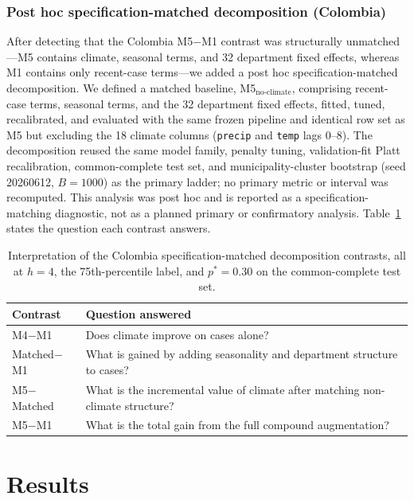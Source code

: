 \documentclass[11pt,a4paper]{article}
\begin{document}
\subsubsection*{Post hoc specification-matched decomposition (Colombia)}
After detecting that the Colombia M5$-$M1 contrast was structurally unmatched---M5 contains climate, seasonal terms, and 32 department fixed effects, whereas M1 contains only recent-case terms---we added a post hoc specification-matched decomposition. We defined a matched baseline, M5$_{\text{no-climate}}$, comprising recent-case terms, seasonal terms, and the 32 department fixed effects, fitted, tuned, recalibrated, and evaluated with the same frozen pipeline and identical row set as M5 but excluding the 18 climate columns (\texttt{precip} and \texttt{temp} lags 0--8). The decomposition reused the same model family, penalty tuning, validation-fit Platt recalibration, common-complete test set, and municipality-cluster bootstrap (seed 20260612, $B=1000$) as the primary ladder; no primary metric or interval was recomputed. This analysis was post hoc and is reported as a specification-matching diagnostic, not as a planned primary or confirmatory analysis. Table~\ref{tab:contrastq} states the question each contrast answers.

\begin{table}[H]
\centering
\caption{Interpretation of the Colombia specification-matched decomposition contrasts, all at $h=4$, the 75th-percentile label, and $p^*=0.30$ on the common-complete test set.}
\label{tab:contrastq}
\begin{tabular}{ll}
\toprule
Contrast & Question answered \\
\midrule
M4$-$M1 & Does climate improve on cases alone? \\
Matched$-$M1 & What is gained by adding seasonality and department structure to cases? \\
M5$-$Matched & What is the incremental value of climate after matching non-climate structure? \\
M5$-$M1 & What is the total gain from the full compound augmentation? \\
\bottomrule
\end{tabular}
\end{table}

\section{Results}
\end{document}
